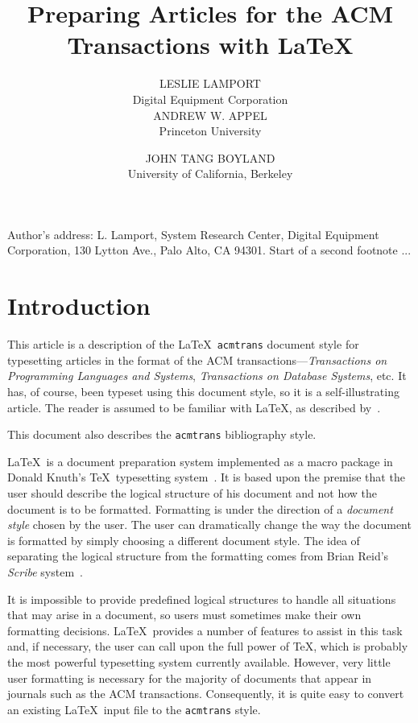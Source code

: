 \documentclass[acmtocl]{acmtrans2m}
\title{Preparing Articles for the ACM Transactions
with \LaTeX}
\author{LESLIE LAMPORT\\Digital Equipment Corporation\\
ANDREW W. APPEL\\Princeton University \and
JOHN TANG BOYLAND\\University of California, Berkeley}
\begin{document}
\setcounter{page}{111}

\begin{bottomstuff}
Author's address: L. Lamport, System Research Center,
Digital Equipment Corporation, 130 Lytton Ave., Palo Alto, CA 
94301.\newline
Start of a second footnote ...
\end{bottomstuff}
\maketitle


\section{Introduction}

This article is a description of the \LaTeX\ {\tt acmtrans} document
style for typesetting articles in the format of the ACM
transactions---{\em Transactions on Programming Languages and
Systems}, {\em Transactions on Database Systems}, etc.  It has, of
course, been typeset using this document style, so it is a
self-illustrating article.  The reader is assumed to be familiar
with \LaTeX, as described by~.

This document also describes the {\tt acmtrans} bibliography style.

\LaTeX\ is a document preparation system
implemented as a macro package in Donald Knuth's
\TeX\ typesetting system~\cite{knuth:texbook}.  It is based
upon the premise that the user should describe the logical structure 
of
his document and not how the document is to be formatted.  Formatting
is under the direction of a {\em document style} chosen by the user.
The user can dramatically change the way the document is formatted by
simply choosing a different document style.  The idea of separating 
the
logical structure from the formatting comes from Brian Reid's {\em
Scribe\/} system~\cite{reid:scribe}.  


It is impossible to provide predefined logical structures to handle 
all
situations that may arise in a document, so users must sometimes make
their own formatting decisions.  \LaTeX\ provides a number of features
to assist in this task and, if necessary, the user can call upon the
full power of \TeX, which is probably the most powerful typesetting
system currently available.  However, very little user formatting is
necessary for the majority of documents that appear in journals such 
as
the ACM transactions.  Consequently, it is quite easy to convert
an existing \LaTeX\ input file to the {\tt acmtrans} style.
\end{document}
